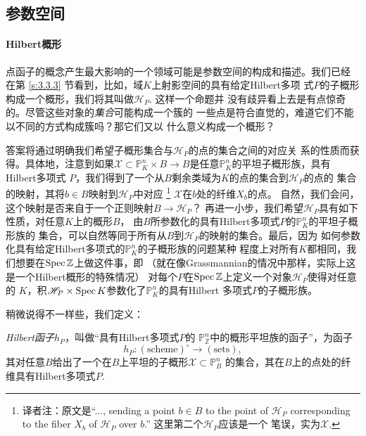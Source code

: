 \subsection{参数空间}\label{s:6.2.2}

\paragraph*{Hilbert概形}

点函子的概念产生最大影响的一个领域可能是参数空间的构成和描述。我们已经
在第 \ref{s:3.3.3} 节看到，比如，域$K$上射影空间的具有给定Hilbert多项
式$P$的子概形构成一个概形，我们将其叫做$\mathscr H_P$. 这样一个命题并
没有歧异看上去是有点惊奇的。尽管这些对象的\emph{集合}可能构成一个簇的
一些点是符合直觉的，难道它们不能以不同的方式构成簇吗？那它们又以
什么意义构成一个概形？

答案将通过明确我们希望子概形集合与$\mathscr H_P$的点的集合之间的对应关
系的性质而获得。具体地，注意到如果$\mathscr X\subset \mathbb P_K^n
\times B\to B$是任意$\mathbb P_K^n$的平坦子概形族，具有Hilbert多项式
$P$，我们得到了一个从$B$剩余类域为$K$的点的集合到$\mathscr H_P$的点的
集合的映射，其将$b\in B$映射到$\mathscr H_P$中对应%
\footnote{译者注：原文是``..., sending a point 
$b\in B$ to the point of $\mathscr H_P$ corresponding to the fiber
$X_b$ of $\mathscr H_P$ over $b$.'' 这里第二个$\mathscr H_P$应该是一个
笔误，实为$\mathscr X$.}%
$\mathscr X$在$b$处的纤维$X_b$的点。
自然，我们会问，这个映射是否来自于一个正则映射$B\to \mathscr H_P$？
再进一小步，我们希望$\mathscr H_P$具有如下性质，对任意$K$上的概形$B$，
由$B$所参数化的具有Hilbert多项式$P$的$\mathbb P_K^n$的平坦子概形族的
集合，可以自然等同于所有从$B$到$\mathscr H_P$的映射的集合。最后，因为
如何参数化具有给定Hilbert多项式的$\mathbb P_K^n$的子概形族的问题某种
程度上对所有$K$都相同，我们想要在$\operatorname{Spec} \mathbb Z$上做这件事，即
（就在像Grassmannian的情况中那样，实际上这是一个Hilbert概形的特殊情况）
对每个$P$在$\operatorname{Spec} \mathbb Z$上定义一个对象$\mathscr H_P$使得对任意的
$K$，积$\mathscr H_P\times \operatorname{Spec} K$参数化了$\mathbb P_K^n$的具有Hilbert
多项式$P$的子概形族。

稍微说得不一样些，我们定义：

\begin{defi}\label{defi:6.21}
\emph{Hilbert函子}$h_P$，叫做“具有Hilbert多项式$P$的
$\mathbb P_{\mathbb Z}^n$中的概形平坦族的函子”，为函子
\[
    h_P:(\text{scheme})^\circ \to (\text{sets}),
\]
其对任意$B$给出了一个在$B$上平坦的子概形$\mathscr X\subset \mathbb P_B^n$
的集合，其在$B$上的点处的纤维具有Hilbert多项式$P$.
\end{defi}

